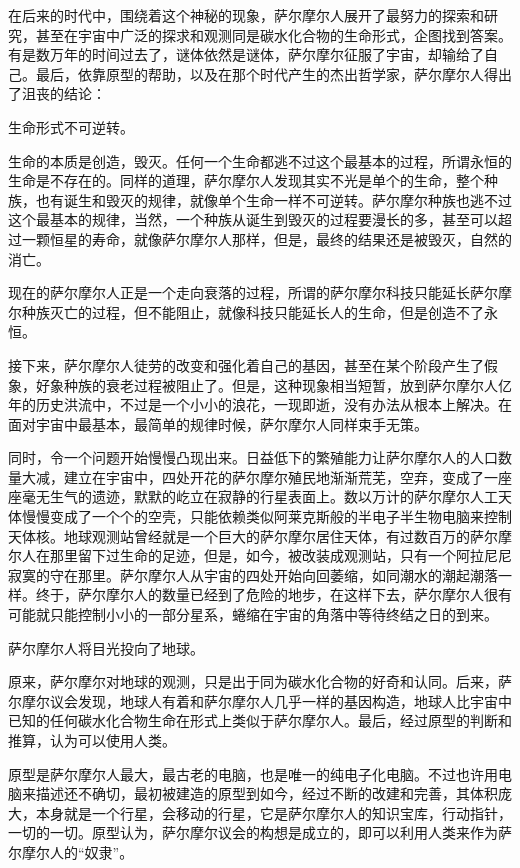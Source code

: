 在后来的时代中，围绕着这个神秘的现象，萨尔摩尔人展开了最努力的探索和研究，甚至在宇宙中广泛的探求和观测同是碳水化合物的生命形式，企图找到答案。有是数万年的时间过去了，谜体依然是谜体，萨尔摩尔征服了宇宙，却输给了自己。最后，依靠原型的帮助，以及在那个时代产生的杰出哲学家，萨尔摩尔人得出了沮丧的结论：

生命形式不可逆转。

生命的本质是创造，毁灭。任何一个生命都逃不过这个最基本的过程，所谓永恒的生命是不存在的。同样的道理，萨尔摩尔人发现其实不光是单个的生命，整个种族，也有诞生和毁灭的规律，就像单个生命一样不可逆转。萨尔摩尔种族也逃不过这个最基本的规律，当然，一个种族从诞生到毁灭的过程要漫长的多，甚至可以超过一颗恒星的寿命，就像萨尔摩尔人那样，但是，最终的结果还是被毁灭，自然的消亡。

现在的萨尔摩尔人正是一个走向衰落的过程，所谓的萨尔摩尔科技只能延长萨尔摩尔种族灭亡的过程，但不能阻止，就像科技只能延长人的生命，但是创造不了永恒。

接下来，萨尔摩尔人徒劳的改变和强化着自己的基因，甚至在某个阶段产生了假象，好象种族的衰老过程被阻止了。但是，这种现象相当短暂，放到萨尔摩尔人亿年的历史洪流中，不过是一个小小的浪花，一现即逝，没有办法从根本上解决。在面对宇宙中最基本，最简单的规律时候，萨尔摩尔人同样束手无策。

同时，令一个问题开始慢慢凸现出来。日益低下的繁殖能力让萨尔摩尔人的人口数量大减，建立在宇宙中，四处开花的萨尔摩尔殖民地渐渐荒芜，空弃，变成了一座座毫无生气的遗迹，默默的屹立在寂静的行星表面上。数以万计的萨尔摩尔人工天体慢慢变成了一个个的空壳，只能依赖类似阿莱克斯般的半电子半生物电脑来控制天体核。地球观测站曾经就是一个巨大的萨尔摩尔居住天体，有过数百万的萨尔摩尔人在那里留下过生命的足迹，但是，如今，被改装成观测站，只有一个阿拉尼尼寂寞的守在那里。萨尔摩尔人从宇宙的四处开始向回萎缩，如同潮水的潮起潮落一样。终于，萨尔摩尔人的数量已经到了危险的地步，在这样下去，萨尔摩尔人很有可能就只能控制小小的一部分星系，蜷缩在宇宙的角落中等待终结之日的到来。

萨尔摩尔人将目光投向了地球。

原来，萨尔摩尔对地球的观测，只是出于同为碳水化合物的好奇和认同。后来，萨尔摩尔议会发现，地球人有着和萨尔摩尔人几乎一样的基因构造，地球人比宇宙中已知的任何碳水化合物生命在形式上类似于萨尔摩尔人。最后，经过原型的判断和推算，认为可以使用人类。

原型是萨尔摩尔人最大，最古老的电脑，也是唯一的纯电子化电脑。不过也许用电脑来描述还不确切，最初被建造的原型到如今，经过不断的改建和完善，其体积庞大，本身就是一个行星，会移动的行星，它是萨尔摩尔人的知识宝库，行动指针，一切的一切。原型认为，萨尔摩尔议会的构想是成立的，即可以利用人类来作为萨尔摩尔人的“奴隶”。

